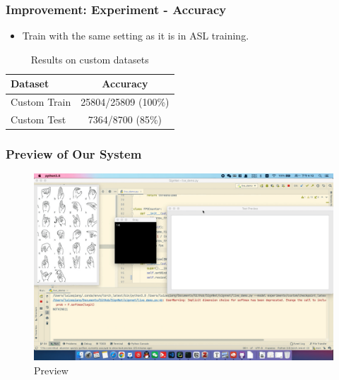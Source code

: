 \documentclass[handout]{beamer}
\begin{document}
\begin{frame}
\frametitle{Improvement: Experiment - Accuracy}

\begin{itemize}
	\item Train with the same setting as it is in ASL training.
\end{itemize}

\begin{table}[h]
\begin{center}
\begin{tabular}{|l|c|}
\hline
Dataset & Accuracy \\
\hline\hline
Custom Train & 25804/25809 (100\%) \\
Custom Test & 7364/8700 (85\%) \\
\hline
\end{tabular}
\end{center}
\caption{Results on custom datasets}
\label{table:result}
\end{table}
\end{frame}

\begin{frame}
\frametitle{Preview of Our System}

\begin{figure}
\includegraphics[scale=0.15]{imgs/preview}
\caption{Preview}
\end{figure}

\end{frame}
\end{document}
